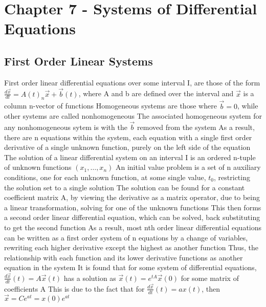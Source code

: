 \documentclass[11 pt, twoside]{article}
\newenvironment{outline*}
{
	\begin{outline}[enumerate]
	}
	{\end{outline}
}
\begin{document}
\section{Chapter 7 - Systems of Differential Equations}
\subsection{First Order Linear Systems}
\begin{outline*}
\1 First order linear differential equations over some interval I, are those of the form $\frac{d\vec{x}}{dt} = A(t)_n\vec{x} + \vec{b}(t)$, where A and b are defined over the interval and $\vec{x}$ is a column n-vector of functions
\2 Homogeneous systems are those where $\vec{b} = 0$, while other systems are called nonhomogeneous
\3 The associated homogeneous system for any nonhomogeneous sytem is with the $\vec{b}$ removed from the system
\2 As a result, there are n equations within the system, each equation with a single first order derivative of a single unknown function, purely on the left side of the equation
\1 The solution of a linear differential system on an interval I is an ordered n-tuple of unknown functions $(x_1, \dots, x_n)$
\2 An initial value problem is a set of n auxiliary conditions, one for each unknown function, at some single value, $t_0$, restricting the solution set to a single solution
\1 The solution can be found for a constant coefficient matrix A, by viewing the derivative as a matrix operator, due to being a linear transformation, solving for one of the unknown functions
\2 This then forms a second order linear differential equation, which can be solved, back substituting to get the second function
\2 As a result, most nth order linear differential equations can be written as a first order system of n equations by a change of variables, rewriting each higher derivative except the highest as another function
\3 Thus, the relationship with each function and its lower derivative functions as another equation in the system
\1 It is found that for some system of differential equations, $\frac{d\vec{x}}{dt}(t) = A\vec{x}(t)$ has a solution as $\vec{x}(t) = e^{tA}\vec{x}(0)$ for some matrix of coefficients A
\2 This is due to the fact that for $\frac{d\vec{x}}{dt}(t) = ax(t)$, then $\vec{x} = Ce^{at} = x(0)e^{at}$
\end{outline*}
\end{document}
